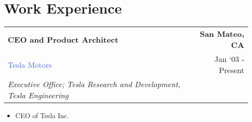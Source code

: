 \documentclass[10pt]{article}
\newcommand{\highlightcolor}{RoyalBlue}
\newcommand{\tabularxwidth}{\textwidth}
\begin{document}
        

    


    
        \section{Work Experience}

    
    \begin{minipage}{\tabularxwidth}

        \begin{tabularx}{\tabularxwidth}{X r}
            \textbf{CEO and Product Architect} & \textbf{San Mateo, 
        CA} \\
            \textcolor{\highlightcolor}{Tesla Motors} & 
        
    Jan ‘03 - Present \\
            
                \textit{Executive Office;}
                    \textit{Tesla Research and Development},
                    \textit{Tesla Engineering} &
            
            
        \end{tabularx}

        \begin{itemize}[noitemsep, topsep=3pt, parsep=0pt, partopsep=0pt]
            
                \item 
    CEO of Tesla Inc.
            
        \end{itemize}

        
            \vspace{.5em}
        

    \end{minipage}
    
\end{document}
